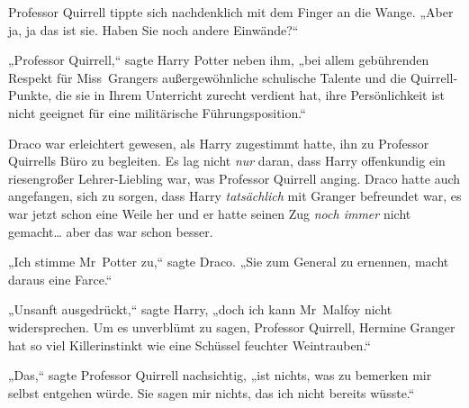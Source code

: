 Professor Quirrell tippte sich nachdenklich mit dem Finger an die Wange. „Aber ja, ja das ist sie. Haben Sie noch andere Einwände?“

„Professor Quirrell,“ sagte Harry Potter neben ihm, „bei allem gebührenden Respekt für Miss~Grangers außergewöhnliche schulische Talente und die Quirrell-Punkte, die sie in Ihrem Unterricht zurecht verdient hat, ihre Persönlichkeit ist nicht geeignet für eine militärische Führungsposition.“

Draco war erleichtert gewesen, als Harry zugestimmt hatte, ihn zu Professor Quirrells Büro zu begleiten. Es lag nicht \emph{nur} daran, dass Harry offenkundig ein riesengroßer Lehrer-Liebling war, was Professor Quirrell anging. Draco hatte auch angefangen, sich zu sorgen, dass Harry \emph{tatsächlich} mit Granger befreundet war, es war jetzt schon eine Weile her und er hatte seinen Zug \emph{noch immer} nicht gemacht… aber das war schon besser.

„Ich stimme Mr~Potter zu,“ sagte Draco. „Sie zum General zu ernennen, macht daraus eine Farce.“

„Unsanft ausgedrückt,“ sagte Harry, „doch ich kann Mr~Malfoy nicht widersprechen. Um es unverblümt zu sagen, Professor Quirrell, Hermine Granger hat so viel Killerinstinkt wie eine Schüssel feuchter Weintrauben.“

„Das,“ sagte Professor Quirrell nachsichtig, „ist nichts, was zu bemerken mir selbst entgehen würde. Sie sagen mir nichts, das ich nicht bereits wüsste.“

